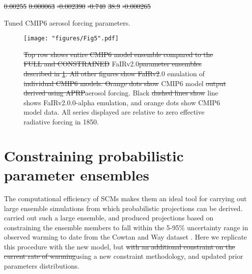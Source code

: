 \documentclass[gmd, manuscript]{copernicus}
\providecommand{\DIFadd}[1]{{\protect\color{blue}#1}} %
\providecommand{\DIFdel}[1]{{\protect\color{red}\sout{#1}}}                      %
\providecommand{\DIFaddbegin}{} %
\providecommand{\DIFaddend}{} %
\providecommand{\DIFdelbegin}{} %
\providecommand{\DIFdelend}{} %
\providecommand{\DIFaddFL}[1]{\DIFadd{#1}} %
\providecommand{\DIFdelFL}[1]{\DIFdel{#1}} %
\providecommand{\DIFaddbeginFL}{} %
\providecommand{\DIFaddendFL}{} %
\providecommand{\DIFdelbeginFL}{} %
\providecommand{\DIFdelendFL}{} %
\begin{document}
\DIFdel{0.00255 }%
\DIFdel{0.000063 }%
\DIFdel{-0.002390 }%
\DIFdel{-0.740 }%
\DIFdel{38.9 }%
\DIFdel{-0.000265 }%
\DIFdelend \DIFaddbegin \clearpage
\begin{table}
    \caption{\DIFaddFL{Tuned CMIP6 aerosol forcing parameters.}}
    \label{table:ERFaer_p}
    
\end{table}
\clearpage
\DIFaddend \begin{figure}[t]
    \DIFdelbeginFL %
\DIFdelendFL \DIFaddbeginFL \texttt{[image: "figures/Fig5".pdf]}
    \DIFaddendFL \caption{\DIFdelbeginFL \DIFdelFL{Top row shows entire CMIP6 model ensemble compared to the FULL and CONSTRAINED }\DIFdelendFL FaIRv2.0\DIFdelbeginFL \DIFdelFL{parameter ensembles described in \ref{NROY}. All other figures show FaIRv2}\DIFdelendFL .0 emulation of \DIFdelbeginFL \DIFdelFL{individual CMIP6 models. Orange dots show }\DIFdelendFL CMIP6 model \DIFdelbeginFL \DIFdelFL{output derived using APRP}\DIFdelendFL \DIFaddbeginFL \DIFaddFL{aerosol forcing}\DIFaddendFL . Black \DIFdelbeginFL \DIFdelFL{dashed lines show }\DIFdelendFL \DIFaddbeginFL \DIFaddFL{line shows }\DIFaddendFL FaIRv2.0\DIFaddbeginFL \DIFaddFL{.0-alpha }\DIFaddendFL emulation\DIFaddbeginFL \DIFaddFL{, and orange dots show CMIP6 model data}\DIFaddendFL . All series displayed are relative to zero effective radiative forcing in 1850.}
    \label{fig:ERFaer_emulation}
\end{figure}
\clearpage
\section{Constraining probabilistic parameter ensembles} \label{NROY}
The computational efficiency of SCMs makes them an ideal tool for carrying out large ensemble simulations from which probabilistic projections can be derived. \cite{Smith2018} carried out such a large ensemble, and produced projections based on constraining the ensemble members to fall within the 5-95\% uncertainty range in observed warming to date from the Cowtan and Way dataset \citep{Cowtan2014}. Here we replicate this procedure with the new model, but \DIFdelbegin \DIFdel{with an additional constraint on the current rate of warming}\DIFdelend \DIFaddbegin \DIFadd{using a new constraint methodology}\DIFaddend , and updated prior parameters distributions.
\end{document}
